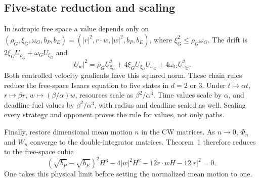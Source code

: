 \subsection{Five-state reduction and scaling}
In isotropic free space a value depends only on
$(\rho_G,\xi_G,\omega_G,b_P,b_E)=(|r|^2,r\cdot w,|w|^2,b_P,b_E)$,
where $\xi_G^2\le\rho_G\omega_G$. The drift is
$2\xi_G U_{\rho_G}+\omega_G U_{\xi_G}$ and
\begin{equation}
 |U_w|^2=\rho_G U_{\xi_G}^2+4\xi_G U_{\xi_G}U_{\omega_G}
                      +4\omega_G U_{\omega_G}^2.
\end{equation}
Both controlled velocity gradients have this squared norm. These chain
rules reduce the free-space Isaacs equation to five states in $d=2$ or
$3$. Under $t\mapsto\alpha t$, $r\mapsto\beta r$,
$w\mapsto(\beta/\alpha)w$, resources scale as $\beta^2/\alpha^3$.
Time values scale by $\alpha$, and deadline-fuel values by
$\beta^2/\alpha^3$, with radius and deadline scaled as well. Scaling
every strategy and opponent proves the rule for values, not only paths.

Finally, restore dimensional mean motion $n$ in the CW matrices. As
$n\to0$, $\Phi_n$ and $W_n$ converge to the double-integrator matrices.
Theorem~1 therefore reduces to the free-space cubic
\begin{equation}
 (\sqrt{b_P}-\sqrt{b_E})^2H^3-4|w|^2H^2
       -12r\cdot w H-12|r|^2=0.
\end{equation}
One takes this physical limit before setting the normalized mean motion
to one.

